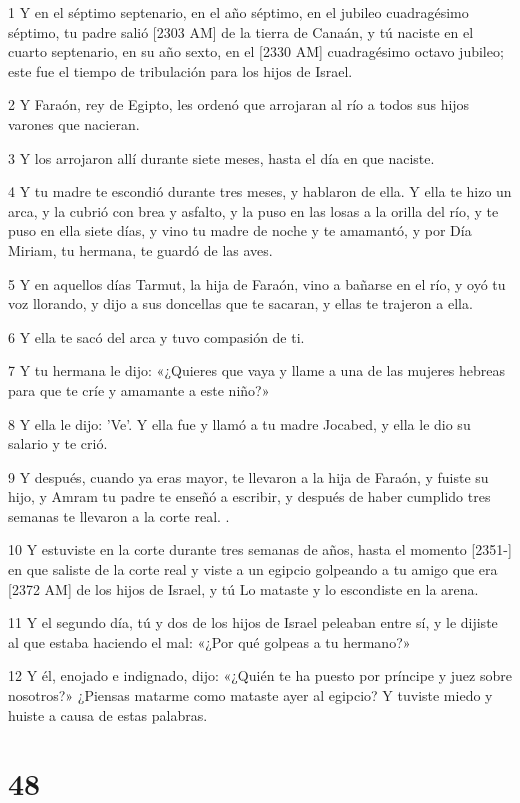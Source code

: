 \par 1 Y en el séptimo septenario, en el año séptimo, en el jubileo cuadragésimo séptimo, tu padre salió [2303 AM] de la tierra de Canaán, y tú naciste en el cuarto septenario, en su año sexto, en el [2330 AM] cuadragésimo octavo jubileo; este fue el tiempo de tribulación para los hijos de Israel.
\par 2 Y Faraón, rey de Egipto, les ordenó que arrojaran al río a todos sus hijos varones que nacieran.
\par 3 Y los arrojaron allí durante siete meses, hasta el día en que naciste.
\par 4 Y tu madre te escondió durante tres meses, y hablaron de ella. Y ella te hizo un arca, y la cubrió con brea y asfalto, y la puso en las losas a la orilla del río, y te puso en ella siete días, y vino tu madre de noche y te amamantó, y por Día Miriam, tu hermana, te guardó de las aves.
\par 5 Y en aquellos días Tarmut, la hija de Faraón, vino a bañarse en el río, y oyó tu voz llorando, y dijo a sus doncellas que te sacaran, y ellas te trajeron a ella.
\par 6 Y ella te sacó del arca y tuvo compasión de ti.
\par 7 Y tu hermana le dijo: «¿Quieres que vaya y llame a una de las mujeres hebreas para que te críe y amamante a este niño?»
\par 8 Y ella le dijo: 'Ve'. Y ella fue y llamó a tu madre Jocabed, y ella le dio su salario y te crió.
\par 9 Y después, cuando ya eras mayor, te llevaron a la hija de Faraón, y fuiste su hijo, y Amram tu padre te enseñó a escribir, y después de haber cumplido tres semanas te llevaron a la corte real. .
\par 10 Y estuviste en la corte durante tres semanas de años, hasta el momento [2351-] en que saliste de la corte real y viste a un egipcio golpeando a tu amigo que era [2372 AM] de los hijos de Israel, y tú Lo mataste y lo escondiste en la arena.
\par 11 Y el segundo día, tú y dos de los hijos de Israel peleaban entre sí, y le dijiste al que estaba haciendo el mal: «¿Por qué golpeas a tu hermano?»
\par 12 Y él, enojado e indignado, dijo: «¿Quién te ha puesto por príncipe y juez sobre nosotros?» ¿Piensas matarme como mataste ayer al egipcio? Y tuviste miedo y huiste a causa de estas palabras.

\chapter{48}

